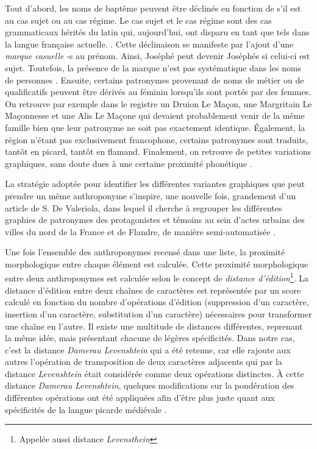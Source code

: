 Tout d'abord, les noms de baptême peuvent être déclinés en fonction de s'il est au cas sujet ou au cas régime\parencite{de_valeriola_lordinateur_2021}. Le cas sujet et le cas régime sont des cas grammaticaux hérités du latin qui, aujourd'hui, ont disparu en tant que tels dans la langue française actuelle. \parencite{kalm_roland_2009}.
Cette déclinaison se manifeste par l'ajout d'une \textit{marque casuelle} \og -s \fg{} au prénom. Ainsi, \og Joséphé \fg{} peut devenir \og Joséphés \fg{} si celui-ci est sujet. Toutefois, la présence de la marque n'est pas systématique dans les noms de personnes \parencite{mazziotta_marquage_2014}.
Ensuite, certains patronymes provenant de noms de métier ou de qualificatifs peuvent être dérivés au féminin lorsqu'ils sont portés par des femmes. On retrouve par exemple dans le registre un Druion Le Maçon, une Margritain Le Maçonnesse et  une Alis Le Maçone qui devaient probablement venir de la même famille bien que leur patronyme ne soit pas exactement identique. Également, la région n'étant pas exclusivement francophone, certains patronymes sont traduits, tantôt en picard, tantôt en flamand. Finalement, on retrouve de petites variations graphiques, sans doute dues à une certaine proximité phonétique \parencite{de_valeriola_lordinateur_2021}.

La stratégie adoptée pour identifier les différentes variantes graphiques que peut prendre un même anthroponyme s'inspire, une nouvelle fois, grandement d'un article de S. De Valeriola, dans lequel il cherche à regrouper les différentes graphies de patronymes des protagonistes et témoins au sein d'actes urbains des villes du nord de la France et de Flandre, de manière semi-automatisée \parencite{de_valeriola_lordinateur_2021}.

Une fois l'ensemble des anthroponymes recensé dans une liste, la proximité morphologique entre chaque élément est calculée. Cette proximité morphologique entre deux anthroponymes est calculée selon le concept de \textit{distance d'édition}\footnote{Appelée aussi distance \textit{Levensthein}}. 
La distance d'édition entre deux chaînes de caractères est représentée par un score calculé en fonction du nombre d'opérations d'édition (suppression d'un caractère, insertion d'un caractère, substitution d'un caractère) nécessaires pour transformer une chaîne en l'autre. Il existe une multitude de distances différentes, reprenant la même idée, mais présentant chacune de légères spécificités. 
Dans notre cas, c'est la distance \textit{Damerau Levenshtein} qui a été retenue, car elle rajoute aux autres l'opération de transposition de deux caractères adjacents qui par la distance \textit{Levenshtein} était considérée comme deux opérations distinctes. 
À cette distance \textit{Damerau Levenshtein}, quelques modifications sur la pondération des différentes opérations ont été appliquées afin d'être plus juste quant aux spécificités de la langue picarde médiévale \parencite{de_valeriola_lordinateur_2021}.

